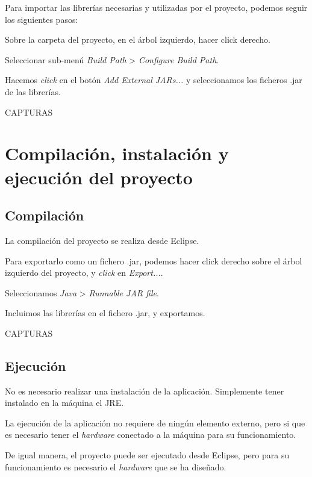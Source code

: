 Para importar las librerías necesarias y utilizadas por el proyecto, podemos seguir los siguientes pasos:

Sobre la carpeta del proyecto, en el árbol izquierdo, hacer click derecho.

Seleccionar sub-menú \emph{Build Path} > \emph{Configure Build Path}.

Hacemos \emph{click} en el botón \emph{Add External JARs...} y seleccionamos los ficheros .jar de las librerías.

CAPTURAS


\section{Compilación, instalación y ejecución del proyecto}


\subsection{Compilación}
La compilación del proyecto se realiza desde Eclipse. 

Para exportarlo como un fichero .jar, podemos hacer click derecho sobre el árbol izquierdo del proyecto, y \emph{click} en \emph{Export...}.

Seleccionamos \emph{Java} > \emph{Runnable JAR file}.

Incluimos las librerías en el fichero .jar, y exportamos.

CAPTURAS

\subsection{Ejecución}

No es necesario realizar una instalación de la aplicación. Simplemente tener instalado en la máquina el JRE.

La ejecución de la aplicación no requiere de ningún elemento externo, pero si que es necesario tener el \emph{hardware} conectado a la máquina para su funcionamiento.

De igual manera, el proyecto puede ser ejecutado desde Eclipse, pero para su funcionamiento es necesario el \emph{hardware} que se ha diseñado.


